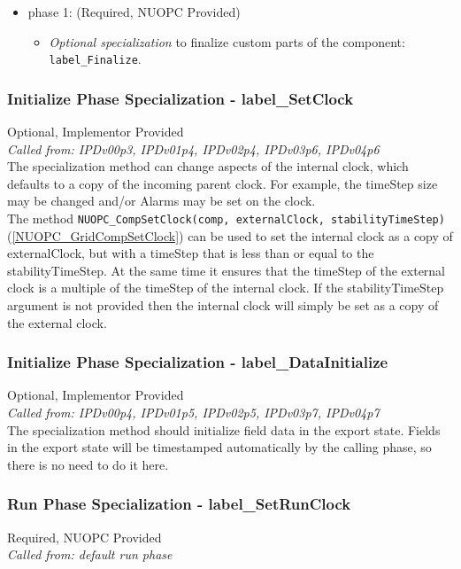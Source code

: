 \begin{itemize}
\item phase 1: ({\sc Required, NUOPC Provided})
  \begin{itemize}
  \item {\it Optional specialization} to finalize custom parts of the component: {\tt label\_Finalize}.
  \end{itemize}      
\end{itemize}

\subsubsection{Initialize Phase Specialization - label\_SetClock}
{\sc Optional, Implementor Provided}\\
{\em Called from: IPDv00p3, IPDv01p4, IPDv02p4, IPDv03p6, IPDv04p6}\\

The specialization method can change aspects of the internal clock, which defaults to a copy of the incoming parent clock. For example, the timeStep size may be changed and/or Alarms may be set on the clock.\\

The method {\tt NUOPC\_CompSetClock(comp, externalClock, stabilityTimeStep)} (\ref{NUOPC_GridCompSetClock}) can be used to set the internal clock as a copy of externalClock, but with a timeStep that is less than or equal to the stabilityTimeStep. At the same time it ensures that the timeStep of the external clock is a multiple of the timeStep of the internal clock. If the stabilityTimeStep argument is not provided then the internal clock will simply be set as a copy of the external clock.

\subsubsection{Initialize Phase Specialization - label\_DataInitialize}
{\sc Optional, Implementor Provided}\\
{\em Called from: IPDv00p4, IPDv01p5, IPDv02p5, IPDv03p7, IPDv04p7}\\

The specialization method should initialize field data in the export state. Fields in the export state will be timestamped automatically by the calling phase, so there is no need to do it here.

\subsubsection{Run Phase Specialization - label\_SetRunClock}
{\sc Required, NUOPC Provided}\\
{\em Called from: default run phase}\\

